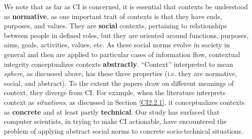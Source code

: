 \documentclass[../thesis.tex]{subfiles}
\begin{document}
\bigskip

We note that as far as CI is concerned, it is essential that contexts be
understood as \textbf{normative}, as one important trait of contexts is
that they have ends, purposes, and values. They are \textbf{social}
contexts, pertaining to relationships between people in defined roles,
but they are oriented around functions, purposes, aims, goals,
activities, values, etc. As these social norms evolve in society in
general and then are applied to particular cases of information flow,
contextual integrity conceptualizes contexts \textbf{abstractly}.
``Context'' interpreted to mean
\textit{sphere}, as discussed above, has these three properties (i.e.
they are normative, social, and abstract). To the extent the papers
draw on different meanings of context, they diverge from CI. For
example, when the literature interprets context as \textit{situations},
as discussed in Section \ref{CI2.2.1}, it conceptualizes contexts as
\textbf{concrete} and at least partly \textbf{technical}. Our study has
surfaced that computer scientists, in trying to make CI actionable,
have encountered the problem of applying abstract social norms to
concrete socio-technical situations.

\clearpage
\end{document}
